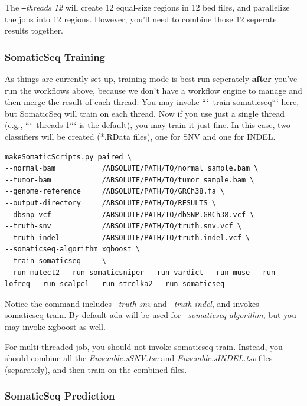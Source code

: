 \documentclass[10pt,letterpaper]{article}
\begin{document}
\begin{sloppypar}
The \textit{\texttt{--}threads 12} will create 12 equal-size regions in 12 bed files, and parallelize the jobs into 12 regions. However, you'll need to combine those 12 seperate results together. 




\subsubsection{SomaticSeq Training}

As things are currently set up, training mode is best run seperately \textbf{after} you've run the workflows above, because we don't have a workflow engine to manage and then merge the result of each thread. You may invoke ```--train-somaticseq``` here, but SomaticSeq will train on each thread. Now if you use just a single thread (e.g., ```--threads 1``` is the default), you may train it just fine. In this case, two classifiers will be created (*.RData files), one for SNV and one for INDEL.

\begin{lstlisting}
makeSomaticScripts.py paired \
--normal-bam           /ABSOLUTE/PATH/TO/normal_sample.bam \
--tumor-bam            /ABSOLUTE/PATH/TO/tumor_sample.bam \
--genome-reference     /ABSOLUTE/PATH/TO/GRCh38.fa \
--output-directory     /ABSOLUTE/PATH/TO/RESULTS \
--dbsnp-vcf            /ABSOLUTE/PATH/TO/dbSNP.GRCh38.vcf \
--truth-snv            /ABSOLUTE/PATH/TO/truth.snv.vcf \
--truth-indel          /ABSOLUTE/PATH/TO/truth.indel.vcf \
--somaticseq-algorithm xgboost \
--train-somaticseq     \
--run-mutect2 --run-somaticsniper --run-vardict --run-muse --run-lofreq --run-scalpel --run-strelka2 --run-somaticseq
\end{lstlisting}

Notice the command includes \textit{--truth-snv} and \textit{--truth-indel}, and invokes somaticseq-train. By default ada will be used for \textit{--somaticseq-algorithm}, but you may invoke xgboost as well.

For multi-threaded job, you should not invoke somaticseq-train. Instead, you should combine all the \textit{Ensemble.sSNV.tsv} and \textit{Ensemble.sINDEL.tsv} files (separately), and then train on the combined files. 




\subsubsection{SomaticSeq Prediction}


\end{sloppypar}
\end{document}
